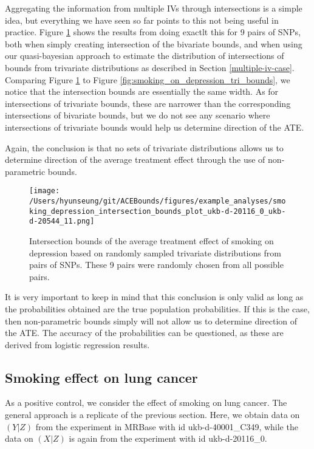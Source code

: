 \documentclass[
]{article}
\theoremstyle{plain}
\begin{document}
Aggregating the information from multiple IVs through intersections is a simple idea, but everything we have seen so far points to this not being useful in practice. Figure \ref{fig:smoking_on_depression_intersections} shows the results from doing exactlt this for 9 pairs of SNPs, both when simply creating intersection of the bivariate bounds, and when using our quasi-bayesian approach to estimate the distribution of intersections of bounds from trivariate distributions as described in Section \ref{multiple-iv-case}. Comparing Figure \ref{fig:smoking_on_depression_intersections} to Figure \ref{fig:smoking_on_depression_tri_bounds}, we notice that the intersection bounds are essentially the same width. As for intersections of trivariate bounds, these are narrower than the corresponding intersections of bivariate bounds, but we do not see any scenario where intersections of trivariate bounds would help us determine direction of the ATE.

Again, the conclusion is that no sets of trivariate distributions allows us to determine direction of the average treatment effect through the use of non-parametric bounds.

\begin{figure}[H]
  \centering
  \texttt{[image: /Users/hyunseung/git/ACEBounds/figures/example\_analyses/smoking\_depression\_intersection\_bounds\_plot\_ukb-d-20116\_0\_ukb-d-20544\_11.png]}
  \caption{Intersection bounds of the average treatment effect of smoking on depression based on randomly sampled trivariate distributions from pairs of SNPs. These 9 pairs were randomly chosen from all possible pairs.}
  \label{fig:smoking_on_depression_intersections}
\end{figure}

It is very important to keep in mind that this conclusion is only valid as long as the probabilities obtained are the true population probabilities. If this is the case, then non-parametric bounds simply will not allow us to determine direction of the ATE. The accuracy of the probabilities can be questioned, as these are derived from logistic regression results.

\hypertarget{smoking-effect-on-lung-cancer}{%
\subsection{Smoking effect on lung cancer}\label{smoking-effect-on-lung-cancer}}

As a positive control, we consider the effect of smoking on lung cancer. The general approach is a replicate of the previous section. Here, we obtain data on \((Y|Z)\) from the experiment in MRBase with id ukb-d-40001\_C349, while the data on \((X|Z)\) is again from the experiment with id ukb-d-20116\_0.
\end{document}
